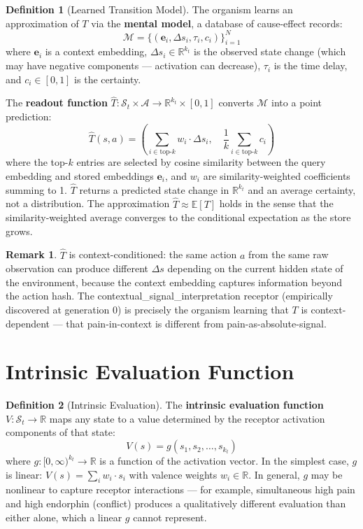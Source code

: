 \documentclass[12pt]{article}
\theoremstyle{definition}
\newtheorem{definition}{Definition}
\newtheorem{remark}{Remark}
\begin{document}
\begin{definition}[Learned Transition Model]
The organism learns an approximation of $T$ via the \textbf{mental model}, a database of
cause-effect records:
\[
\mathcal{M} = \{(\mathbf{e}_i, \Delta s_i, \tau_i, c_i)\}_{i=1}^{N}
\]
where $\mathbf{e}_i$ is a context embedding, $\Delta s_i \in \mathbb{R}^{k_t}$ is the
observed state change (which may have negative components --- activation can decrease),
$\tau_i$ is the time delay, and $c_i \in [0,1]$ is the certainty.

The \textbf{readout function} $\hat{T} : \mathcal{S}_t \times \mathcal{A} \to \mathbb{R}^{k_t} \times [0,1]$
converts $\mathcal{M}$ into a point prediction:
\[
\hat{T}(s, a) = \left(\sum_{i \in \text{top-}k} w_i \cdot \Delta s_i, \quad
\frac{1}{k}\sum_{i \in \text{top-}k} c_i\right)
\]
where the top-$k$ entries are selected by cosine similarity between the query embedding
and stored embeddings $\mathbf{e}_i$, and $w_i$ are similarity-weighted coefficients
summing to 1. $\hat{T}$ returns a predicted state change in $\mathbb{R}^{k_t}$ and an
average certainty, not a distribution. The approximation $\hat{T} \approx \mathbb{E}[T]$
holds in the sense that the similarity-weighted average converges to the conditional
expectation as the store grows.
\end{definition}

\begin{remark}
$\hat{T}$ is context-conditioned: the same action $a$ from the same raw observation
can produce different $\Delta s$ depending on the current hidden state of the environment,
because the context embedding captures information beyond the action hash. The
contextual\_signal\_interpretation receptor (empirically discovered at generation 0)
is precisely the organism learning that $T$ is context-dependent --- that pain-in-context
is different from pain-as-absolute-signal.
\end{remark}

\section{Intrinsic Evaluation Function}

\begin{definition}[Intrinsic Evaluation]
The \textbf{intrinsic evaluation function} $V : \mathcal{S}_t \to \mathbb{R}$ maps any
state to a value determined by the receptor activation components of that state:
\[
V(s) = g(s_1, s_2, \ldots, s_{k_t})
\]
where $g : [0,\infty)^{k_t} \to \mathbb{R}$ is a function of the activation vector.
In the simplest case, $g$ is linear: $V(s) = \sum_{i} w_i \cdot s_i$ with valence
weights $w_i \in \mathbb{R}$. In general, $g$ may be nonlinear to capture receptor
interactions --- for example, simultaneous high pain and high endorphin (conflict)
produces a qualitatively different evaluation than either alone, which a linear $g$
cannot represent.
\end{definition}
\end{document}
